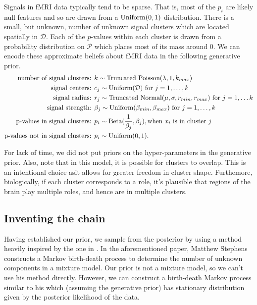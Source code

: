 \documentclass[12pt]{article}
\begin{document}
Signals in fMRI data typically tend to be sparse. That is, most of the $p_i$ are likely null features and so are drawn from a $\mbox{Uniform}(0,1)$ distribution. 
There is a small, but unknown, number of unknown signal clusters which are located spatially in $\mathcal{D}$.  
Each of the $p$-values within each cluster is drawn from a probability distribution on $\mathcal{P}$
which places most of its mass around $0$.  We can encode these approximate beliefs about fMRI data in the following generative prior. 
\begin{equation}
\begin{split}
\mbox{number of signal clusters: } & k \sim \mbox{Truncated Poisson}(\lambda,  1, k_{max}) \\
\mbox{signal centers: }&  c_j \sim \mbox{Uniform}(\mathcal{D}) \mbox{ for $j = 1, \ldots, k$} \\
\mbox{signal radius: }&  r_j \sim \mbox{Truncated Normal}(\mu,\sigma,r_{min},r_{max}) \mbox{ for $j = 1, \ldots k$} \\
\mbox{signal strength: }& \beta_j \sim \mbox{Uniform}(\beta_{min},\beta_{max}) \mbox{ for $j = 1, \ldots, k$} \\
\mbox{p-values in signal clusters: }& p_i \sim \mbox{Beta}(\frac{1}{\beta_j}, \beta_j), \mbox{when $x_i$ is in cluster $j$} \\
\mbox{p-values not in signal clusters: }& p_i \sim \mbox{Uniform}(0,1). 
\end{split}
\end{equation}


For lack of time, we did not put priors on the hyper-parameters in the generative prior. Also, note that in this model, it is possible for clusters to overlap. This is an intentional choice asit allows for greater freedom in cluster shape. Furthemore, biologically, if each cluster corresponds to a role, it's plausible that regions of the brain play multiple roles, and hence
are in multiple clusters. 

\subsection{Inventing the chain}

Having established our prior, we sample from the posterior by using a method heavily inspired by the one in \cite{stephens2000bayesian}. 
In the aforementioned paper, Matthew Stephens constructs a Markov birth-death process to determine the number of unknown components in a mixture model. Our prior is not a mixture model, so we can't use his method directly. However, we can construct a birth-death Markov process similar to his 
which (assuming the generative prior) has stationary distribution given by the posterior likelihood of the data. 
\end{document}
